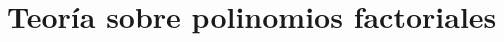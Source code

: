 \chapter{Teoría sobre polinomios factoriales}\label{app:ApendiceII}
\startcontents[chapters]
\newpage
